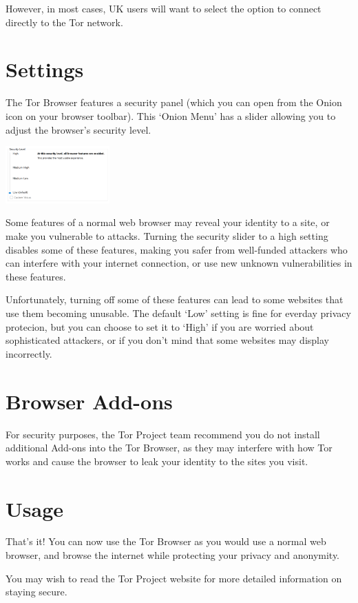 \documentclass[10.5pt,a4paper]{article} %
\begin{document}
\begin{multicols*}{2}
However, in most cases, UK users will want to select the option to connect directly to the Tor network.


\section*{Settings}
The Tor Browser features a security panel (which you can open from the Onion icon on your browser toolbar). This `Onion Menu' has a slider allowing you to adjust the browser's security level.

\begin{center}
	\includegraphics[width=0.30\textwidth]{onion-menu.png}
\end{center}

Some features of a normal web browser may reveal your identity to a site, or make you vulnerable to attacks. Turning the security slider to a high setting disables some of these features, making you safer from well-funded attackers who can interfere with your internet connection, or use new unknown vulnerabilities in these features.

Unfortunately, turning off some of these features can lead to some websites that use them becoming unusable. The default `Low' setting is fine for everday privacy protecion, but you can choose to set it to `High' if you are worried about sophisticated attackers, or if you don't mind that some websites may display incorrectly.


\section*{Browser Add-ons}
For security purposes, the Tor Project team recommend you do not install additional Add-ons into the Tor Browser, as they may interfere with how Tor works and cause the browser to leak your identity to the sites you visit.


\section*{Usage}
That's it! You can now use the Tor Browser as you would use a normal web browser, and browse the internet while protecting your privacy and anonymity.

You may wish to read the Tor Project website for more detailed information on staying secure.



\end{multicols*}
\end{document}
